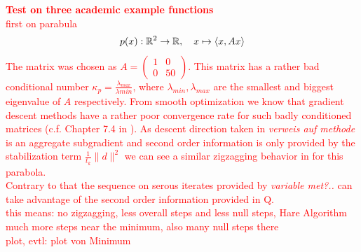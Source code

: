 \textcolor{red}{\textbf{Test on three academic example functions}\\
first on parabula
\[p(x): \mathbb{R}^2 \to \mathbb{R}, \quad x \mapsto \left\langle x, Ax \right\rangle\]
The matrix was chosen as \(A = \begin{pmatrix} 1&0 \\ 0&50\end{pmatrix}\). This matrix has a rather bad conditional number \(\kappa_p = \frac{\lambda_{max}}{\lambda{min}}\), where \(\lambda_{min}, \lambda_{max}\) are the smallest and biggest eigenvalue of \(A\) respectively. From smooth optimization we know that gradient descent methods have a rather poor convergence rate for such badly conditioned matrices (c.f. Chapter 7.4 in \cite{Ulbrich2012}). As descent direction taken in \emph{verweis auf methode} is an aggregate subgradient and second order information is only provided by the stabilization term \(\frac{1}{t_k}\|d\|^2\) we can see a similar zigzagging behavior in for this parabola.\\
Contrary to that the sequence on serous iterates provided by \emph{variable met?..} can take advantage of the second order information provided in Q.\\
this means: no zigzagging, less overall steps and less null steps, Hare Algorithm much more steps near the minimum, also many null steps there}\\
\textcolor{red}{plot, evtl: plot von Minimum}

